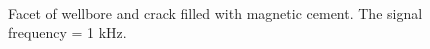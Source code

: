 \documentclass[10pt,twoside]{article}
\begin{document}
\begin{figure}[ht!]
\begin{minipage}{0.50\linewidth}
\end{minipage}
\hfill
\begin{minipage}{0.50\linewidth}
\end{minipage}
\caption{Facet of wellbore and crack filled with magnetic cement. The signal frequency = 1 kHz. }
\label{facet_crack}\

\end{figure}
\end{document}
